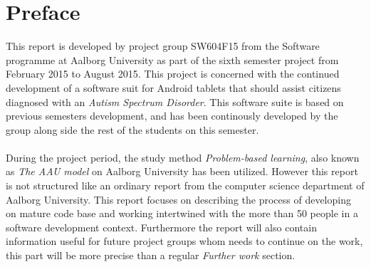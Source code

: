 
\chapter*{Preface}

This report is developed by project group SW604F15 from the Software programme at Aalborg University as part of the sixth semester project from February 2015 to August 2015. This project is concerned with the continued development of a software suit for Android tablets that should assist citizens diagnosed with an \emph{Autism Spectrum Disorder}. This software suite is based on previous semesters development, and has been continously developed by the group along side the rest of the students on this semester.
\\\\
During the project period, the study method \emph{Problem-based learning}, also known as \emph{The AAU model} on Aalborg University has been utilized. However this report is not structured like an ordinary report from the computer science department of Aalborg University. This report focuses on describing the process of developing on mature code base and working intertwined with the more than 50 people in a software development context. Furthermore the report will also contain information useful for future project groups whom needs to continue on the work, this part will be more precise than a regular \emph{Further work} section.

